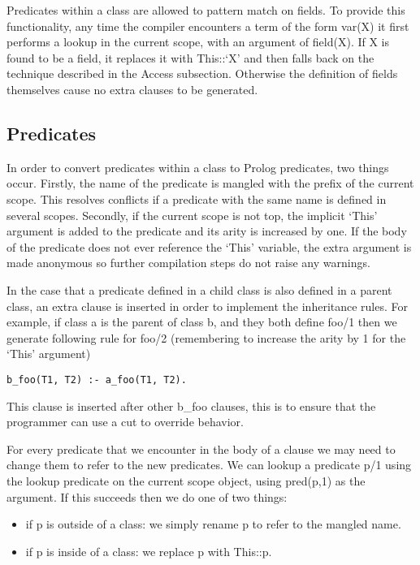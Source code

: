 \documentclass[12pt,a4paper,twoside,openright]{report}
\begin{document}
Predicates within a class are allowed to pattern match on fields. To provide this functionality, any time the compiler encounters a term of the form var(X) it first performs a lookup in the current scope, with an argument of field(X). If X is found to be a field, it replaces it with This::`X' and then falls back on the technique described in the Access subsection. Otherwise the definition of fields themselves cause no extra clauses to be generated.  

\subsection{Predicates}

In order to convert predicates within a class to Prolog predicates, two things occur. Firstly, the name of the predicate is mangled with the prefix of the current scope. This resolves conflicts if a predicate with the same name is defined in several scopes. Secondly, if the current scope is not top, the implicit `This' argument is added to the predicate and its arity is increased by one. If the body of the predicate does not ever reference the `This' variable, the extra argument is made anonymous so further compilation steps do not raise any warnings.

\bigskip

In the case that a predicate defined in a child class is also defined in a parent class, an extra clause is inserted in order to implement the inheritance rules. For example, if class a is the parent of class b, and they both define foo/1 then we generate following rule for foo/2 (remembering to increase the arity by 1 for the `This' argument)

\begin{lstlisting}
b_foo(T1, T2) :- a_foo(T1, T2).
\end{lstlisting}

This clause is inserted after other b_foo clauses, this is to ensure that the programmer can use a cut to override behavior.

\bigskip

For every predicate that we encounter in the body of a clause we may need to change them to refer to the new predicates. We can lookup a predicate p/1 using the lookup predicate on the current scope object, using pred(p,1) as the argument. If this succeeds then we do one of two things:

\begin{itemize}
	\item if p is outside of a class: we simply rename p to refer to the mangled name.
	\item if p is inside of a class: we replace p with This::p.
\end{itemize}
\end{document}
